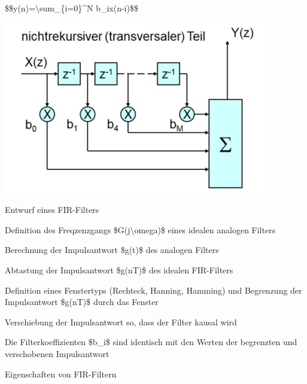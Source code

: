 \documentclass[a4paper]{article}
\begin{document}
\begin{multicols}{3}
  \$\$y(n)=\textbackslash sum\_\{i=0\}\^{}N b\_ix(n-i)\$\$

  \begin{itemize*}
    \item \includegraphics[width=.5\linewidth]{Assets/Biosignalverarbeitung-fir-nichtrekursiv.png}
  \end{itemize*}

  Entwurf eines FIR-Filters

  \begin{enumerate*}
    \def\labelenumi{\arabic{enumi}.}
    \item Definition des Freqzenzgangs \$G(j\textbackslash omega)\$ eines idealen analogen Filters
    \item Berechnung der Impulsantwort \$g(t)\$ des analogen Filters
    \item Abtastung der Impulsantwort \$g(nT)\$ des idealen FIR-Filters
    \item Definition eines Fenstertyps (Rechteck, Hanning, Hamming) und Begrenzung der Impulsantwort \$g(nT)\$ durch das Fenster
    \item Verschiebung der Impulsantwort so, dass der Filter kausal wird
    \item Die Filterkoeffizienten \$b\_i\$ sind identisch mit den Werten der begrenzten und verschobenen Impulsantwort
  \end{enumerate*}

  Eigenschaften von FIR-Filtern


\end{multicols}
\end{document}
